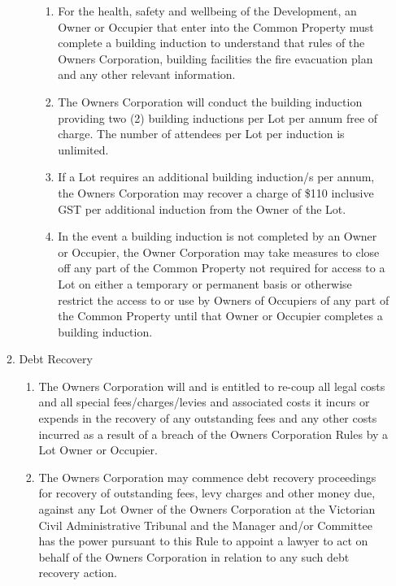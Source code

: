 \documentclass{article}
\begin{document}
\begin{enumerate}[label=\arabic*.]
\begin{enumerate}[label=\arabic{enumi}.\arabic*.]
\begin{enumerate}[label=(\arabic*)]
\begin{enumerate}[label=(\alph*)]
\item  For the health, safety and wellbeing of the Development, an Owner or Occupier that enter into the Common Property must complete a building induction to understand that rules of the Owners Corporation, building facilities the fire evacuation plan and any other relevant information.

\item  The Owners Corporation will conduct the building induction providing two (2) building inductions per Lot per annum free of charge. The number of attendees per Lot per induction is unlimited.

\item  If a Lot requires an additional building induction/s per annum, the Owners Corporation may recover a charge of \$110 inclusive GST per additional induction from the Owner of the Lot.

\item  In the event a building induction is not completed by an Owner or Occupier, the Owner Corporation may take measures to close off any part of the Common Property not required for access to a Lot on either a temporary or permanent basis or otherwise restrict the access to or use by Owners of Occupiers of any part of the Common Property until that Owner or Occupier completes a building induction.

\end{enumerate}

\end{enumerate}

\item  Debt Recovery

\begin{enumerate}[label=(\arabic*)]

\item  The Owners Corporation will and is entitled to re-coup all legal costs and all special fees/charges/levies and associated costs it incurs or expends in the recovery of any outstanding fees and any other costs incurred as a result of a breach of the Owners Corporation Rules by a Lot Owner or Occupier.

\item  The Owners Corporation may commence debt recovery proceedings for recovery of outstanding fees, levy charges and other money due, against any Lot Owner of the Owners Corporation at the Victorian Civil Administrative Tribunal and the Manager and/or Committee has the power pursuant to this Rule to appoint a lawyer to act on behalf of the Owners Corporation in relation to any such debt recovery action.


\end{enumerate}
\end{enumerate}
\end{enumerate}
\end{document}
